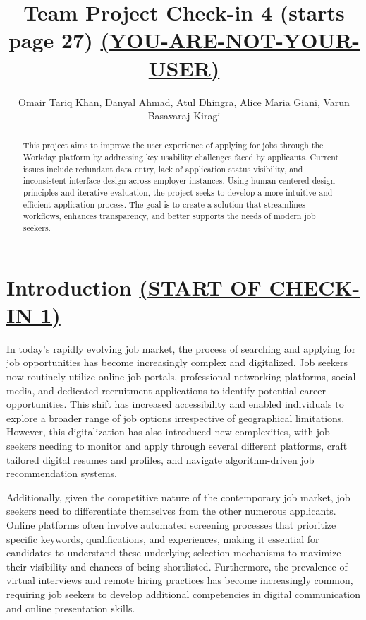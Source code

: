 \documentclass[
	letterpaper, %
]{jdf}
\author{Omair Tariq Khan, Danyal Ahmad, Atul Dhingra, Alice Maria Giani, Varun Basavaraj Kiragi}
\title{Team Project Check-in 4 \textbf{(starts page 27)} \underline{\textbf{(YOU-ARE-NOT-YOUR-USER)}}}
\begin{document}

\maketitle
\begin{sloppypar}


\begin{abstract}
	This project aims to improve the user experience of applying for jobs through the Workday platform by addressing key usability challenges faced by applicants. Current issues include redundant data entry, lack of application status visibility, and inconsistent interface design across employer instances. Using human-centered design principles and iterative evaluation, the project seeks to develop a more intuitive and efficient application process. The goal is to create a solution that streamlines workflows, enhances transparency, and better supports the needs of modern job seekers.
\end{abstract}

\hfill \break

\section{Introduction \underline{(START OF CHECK-IN 1)}}
In today's rapidly evolving job market, the process of searching and applying for job opportunities has become increasingly complex and digitalized. Job seekers now routinely utilize online job portals, professional networking platforms, social media, and dedicated recruitment applications to identify potential career opportunities. This shift has increased accessibility and enabled individuals to explore a broader range of job options irrespective of geographical limitations. However, this digitalization has also introduced new complexities, with job seekers needing to monitor and apply through several different platforms, craft tailored digital resumes and profiles, and navigate algorithm-driven job recommendation systems.

Additionally, given the competitive nature of the contemporary job market, job seekers need to differentiate themselves from the other numerous applicants. Online platforms often involve automated screening processes that prioritize specific keywords, qualifications, and experiences, making it essential for candidates to understand these underlying selection mechanisms to maximize their visibility and chances of being shortlisted. Furthermore, the prevalence of virtual interviews and remote hiring practices has become increasingly common, requiring job seekers to develop additional competencies in digital communication and online presentation skills.


\end{sloppypar}
\end{document}
